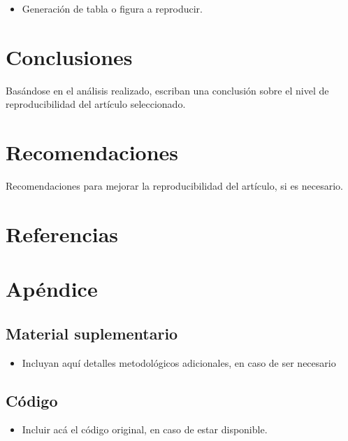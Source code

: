 \documentclass[
  spanish,
  13pt,
  letterpaper,
  DIV=11,
  numbers=noendperiod]{scrartcl}
\providecommand{\tightlist}{%
  \setlength{\itemsep}{0pt}\setlength{\parskip}{0pt}}
\begin{document}
\begin{itemize}
\tightlist
\item
  Generación de tabla o figura a reproducir.
\end{itemize}

\section{Conclusiones}\label{conclusiones}

Basándose en el análisis realizado, escriban una conclusión sobre el
nivel de reproducibilidad del artículo seleccionado.

\section{Recomendaciones}\label{recomendaciones}

Recomendaciones para mejorar la reproducibilidad del artículo, si es
necesario.

\section{Referencias}\label{referencias}

\protect{}\label{refs}

\section{Apéndice}\label{apuxe9ndice}

\subsection{Material suplementario}\label{material-suplementario}

\begin{itemize}
\tightlist
\item
  Incluyan aquí detalles metodológicos adicionales, en caso de ser
  necesario
\end{itemize}

\subsection{Código}\label{cuxf3digo}

\begin{itemize}
\tightlist
\item
  Incluir acá el código original, en caso de estar disponible.
\end{itemize}
\end{document}
